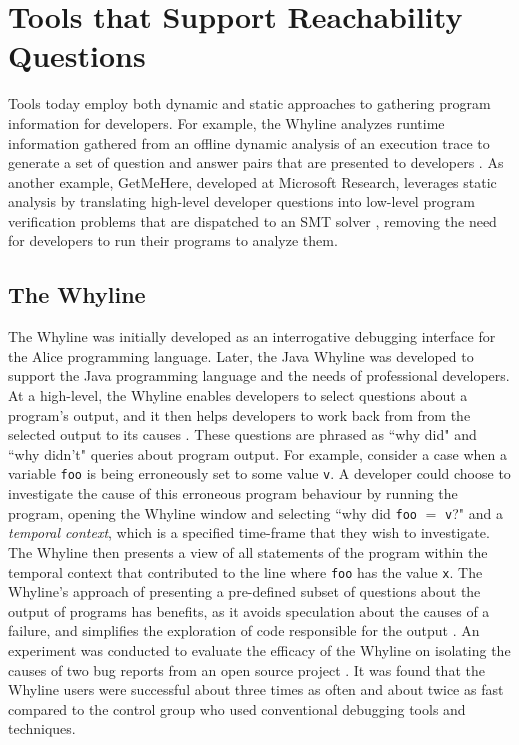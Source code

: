 \section{Tools that Support Reachability Questions}
\label{sec:ToolsSupportReachabilityQuestions}

\noindent Tools today employ both dynamic and static approaches to gathering
program information for developers.
For example, the Whyline analyzes runtime information gathered from an offline 
dynamic analysis of an execution trace to generate a set of question and answer 
pairs that are presented to developers \cite{ko-2004-whyline}.
As another example, GetMeHere, developed at Microsoft Research, leverages static 
analysis by translating high-level developer questions into low-level program 
verification problems that are dispatched to an \ac{SMT} solver \cite{barnett-2014-get}, 
removing the need for developers to run their programs to analyze them.

\subsection{The Whyline}
\label{subsec:TheWhyline}

\par The Whyline was initially developed as an interrogative debugging interface
for the Alice programming language. Later, the Java Whyline \cite{ko-2009-java-whyline}
was developed to support the Java programming language and the needs of 
professional developers.
At a high-level, the Whyline enables developers to select questions about a
program's output, and it then helps developers to work back from from the 
selected output to its causes \cite{ko-2009-java-whyline}.
These questions are phrased as ``why did" and ``why didn't"
queries about program output.
For example, consider a case when a variable \texttt{foo} is being erroneously 
set to some value \texttt{v}.
A developer could choose to investigate the cause of this erroneous program
behaviour by running the program, opening the Whyline window and selecting
``why did \texttt{foo} $=$ \texttt{v}?" and a \emph{temporal context}, which is
a specified time-frame that they wish to investigate.
The Whyline then presents a view of all statements of the program within the
temporal context that contributed to the line where \texttt{foo} has the value
\texttt{x}. 
The Whyline's approach of presenting a pre-defined subset of questions about the 
output of programs has benefits, as it avoids speculation about the causes of
a failure, and simplifies the exploration of code responsible for the output
\cite{ko-2009-java-whyline}.
An experiment was conducted to evaluate the efficacy of the Whyline on 
isolating the causes of two bug reports from an open source project \cite{ko-2009-java-whyline}.
It was found that the Whyline users were successful about three times as often
and about twice as fast compared to the control group who used conventional
debugging tools and techniques.

